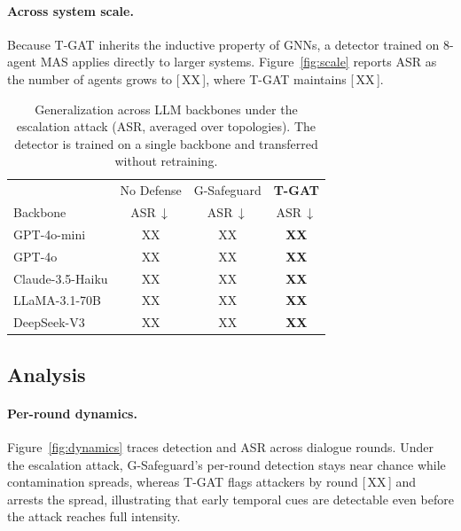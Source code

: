 \paragraph{Across system scale.}
Because T-GAT inherits the inductive property of GNNs, a detector trained on
8-agent MAS applies directly to larger systems. Figure~\ref{fig:scale} reports ASR
as the number of agents grows to [\,XX\,], where T-GAT maintains [\,XX\,].

\begin{table}[t]
\centering
\setlength{\tabcolsep}{4pt}
\begin{tabular}{lccc}
\toprule
& No Defense & G-Safeguard & \textbf{T-GAT} \\
Backbone & ASR\,$\downarrow$ & ASR\,$\downarrow$ & ASR\,$\downarrow$ \\
\midrule
GPT-4o-mini       & XX & XX & \textbf{XX} \\
GPT-4o            & XX & XX & \textbf{XX} \\
Claude-3.5-Haiku  & XX & XX & \textbf{XX} \\
LLaMA-3.1-70B     & XX & XX & \textbf{XX} \\
DeepSeek-V3       & XX & XX & \textbf{XX} \\
\bottomrule
\end{tabular}
\caption{Generalization across LLM backbones under the escalation attack (ASR,
averaged over topologies). The detector is trained on a single backbone and
transferred without retraining.}
\label{tab:generalize}
\end{table}

\subsection{Analysis}
\label{sec:exp_analysis}

\paragraph{Per-round dynamics.}
Figure~\ref{fig:dynamics} traces detection and ASR across dialogue rounds. Under
the escalation attack, G-Safeguard's per-round detection stays near chance while
contamination spreads, whereas T-GAT flags attackers by round [\,XX\,] and arrests
the spread, illustrating that early temporal cues are detectable even before the
attack reaches full intensity.

